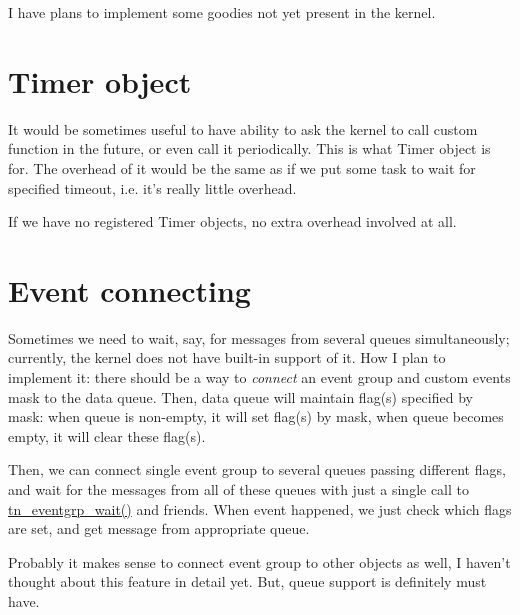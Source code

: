 I have plans to implement some goodies not yet present in the kernel.\hypertarget{plans_plans_timer}{}\section{Timer object}\label{plans_plans_timer}
It would be sometimes useful to have ability to ask the kernel to call custom function in the future, or even call it periodically. This is what Timer object is for. The overhead of it would be the same as if we put some task to wait for specified timeout, i.\+e. it's really little overhead.

If we have no registered Timer objects, no extra overhead involved at all.\hypertarget{plans_plans_event_connect}{}\section{Event connecting}\label{plans_plans_event_connect}
Sometimes we need to wait, say, for messages from several queues simultaneously; currently, the kernel does not have built-\/in support of it. How I plan to implement it\+: there should be a way to {\itshape connect} an event group and custom events mask to the data queue. Then, data queue will maintain flag(s) specified by mask\+: when queue is non-\/empty, it will set flag(s) by mask, when queue becomes empty, it will clear these flag(s).

Then, we can connect single event group to several queues passing different flags, and wait for the messages from all of these queues with just a single call to {\ttfamily \hyperlink{tn__eventgrp_8h_aee53d0c38f050ee6eecbdce19548b157}{tn\+\_\+eventgrp\+\_\+wait()}} and friends. When event happened, we just check which flags are set, and get message from appropriate queue.

Probably it makes sense to connect event group to other objects as well, I haven't thought about this feature in detail yet. But, queue support is definitely must have. 